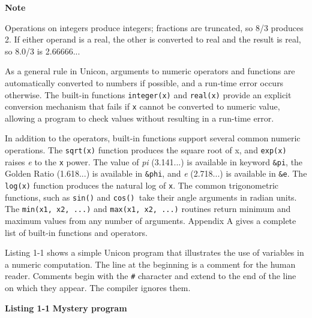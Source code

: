 {\sffamily\bfseries
Note}

{\sffamily
Operations on integers produce integers; fractions are truncated, so 8/3
produces 2. If either operand is a real, the other is converted to real
and the result is real, so 8.0/3 is 2.66666...}

As a general rule in Unicon, arguments to numeric operators and
functions are automatically converted to numbers if possible, and a run-time error occurs otherwise. The built-in functions
\texttt{integer(x)} and
\texttt{real(x)} provide an explicit conversion
mechanism that fails if \texttt{x} cannot be converted to numeric
value, allowing a program to check values without resulting in a
run-time error.

In addition to the operators, built-in functions support several common
numeric operations. The
\texttt{sqrt(x)} function produces the square root of x,
and \texttt{exp(x)} raises \textit{e} to the \texttt{x}
power. The value of \textit{pi} (3.141...) is
available in keyword \texttt{\&pi}, the Golden Ratio (1.618...) is available in \texttt{\&phi}, and \textit{e} (2.718...) is available in
\texttt{\&e}. The \texttt{log(x)}
function produces the natural log of
\texttt{x}. The common trigonometric
functions, such as \texttt{sin()} and
\texttt{cos()}\texttt{ }take their angle arguments in
radian units. The \texttt{min(x1, x2, ...)}
and \texttt{max(x1, x2, ...)} routines return minimum and
maximum values from any number of arguments. Appendix A gives a
complete list of built-in functions and operators.

Listing 1-1 shows a simple Unicon program that illustrates the use of
variables in a numeric computation. The line at the beginning is a
comment for the human reader. Comments begin with the
\texttt{\#} character and extend to the end of the line on which they
appear. The compiler ignores them.

\bigskip

{\sffamily\bfseries Listing 1-1}
{\sffamily\bfseries Mystery program}

